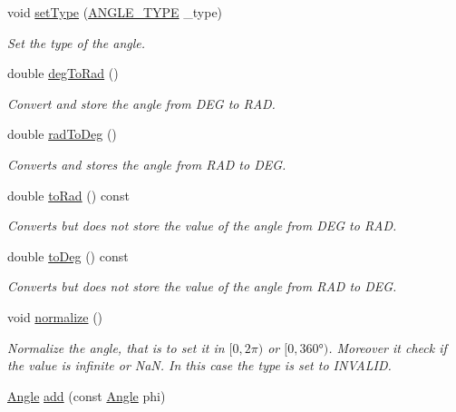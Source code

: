 \begin{DoxyCompactItemize}
void \mbox{\hyperlink{class_angle_a831ac6c6d607545b82f129a4d8f15a8e}{set\+Type}} (\mbox{\hyperlink{class_angle_a4f7b9849ce8780bcba95ca3ee45cff77}{A\+N\+G\+L\+E\+\_\+\+T\+Y\+PE}} \+\_\+type)
\begin{DoxyCompactList}\small\item\em Set the type of the angle. \end{DoxyCompactList}\item 
double \mbox{\hyperlink{class_angle_a0db2d1c054e899c7f5d27091a82dec4a}{deg\+To\+Rad}} ()
\begin{DoxyCompactList}\small\item\em Convert and store the angle from D\+EG to R\+AD. \end{DoxyCompactList}\item 
double \mbox{\hyperlink{class_angle_a8d7691e304041c8deafdec82497a781f}{rad\+To\+Deg}} ()
\begin{DoxyCompactList}\small\item\em Converts and stores the angle from R\+AD to D\+EG. \end{DoxyCompactList}\item 
double \mbox{\hyperlink{class_angle_ad471cb182722fd7c44cba5aca446ed2c}{to\+Rad}} () const
\begin{DoxyCompactList}\small\item\em Converts but does not store the value of the angle from D\+EG to R\+AD. \end{DoxyCompactList}\item 
double \mbox{\hyperlink{class_angle_a89b1e5b7b71fc1bf9565da0bef8f361f}{to\+Deg}} () const
\begin{DoxyCompactList}\small\item\em Converts but does not store the value of the angle from R\+AD to D\+EG. \end{DoxyCompactList}\item 
void \mbox{\hyperlink{class_angle_a449fc0638ca2e26b4a57d1cce95788e8}{normalize}} ()
\begin{DoxyCompactList}\small\item\em Normalize the angle, that is to set it in $[0, 2\pi)$ or $[0, 360°)$. Moreover it check if the value is infinite or NaN. In this case the {\ttfamily type} is set to {\ttfamily I\+N\+V\+A\+L\+ID}. \end{DoxyCompactList}\item 
\mbox{\hyperlink{class_angle}{Angle}} \mbox{\hyperlink{class_angle_ab7279e3fb4ab12c334153f992ede0f1c}{add}} (const \mbox{\hyperlink{class_angle}{Angle}} phi)

\end{DoxyCompactItemize}
